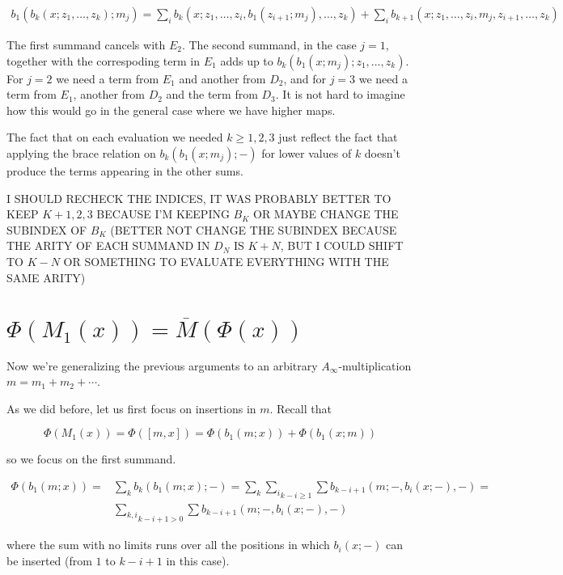 \documentclass[twoside]{article}
\begin{document}
\begin{align*}
b_1(b_k(x;z_1,\dots, z_k);m_j)=\sum_ib_k(x;z_1,\dots, z_i, b_1(z_{i+1};m_j),\dots, z_k)+\sum_ib_{k+1}(x;z_1,\dots, z_i,m_j,z_{i+1},\dots, z_k)
\end{align*}

The first summand cancels with $E_2$. The second summand, in the case $j=1$, together with the correspoding term in $E_1$ adds up to $b_k(b_1(x;m_j);z_1,\dots, z_k)$. For $j=2$ we need a term from $E_1$ and another from $D_2$, and for $j=3$ we need a term from $E_1$, another from $D_2$ and the term from $D_3$. It is not hard to imagine how this would go in the general case where we have higher maps. 

\begin{remark}
The fact that on each evaluation we needed $k\geq 1,2,3$ just reflect the fact that applying the brace relation on $b_k(b_1(x;m_j);-)$ for lower values of $k$ doesn't produce the terms appearing in the other sums. 
\end{remark}

I SHOULD RECHECK THE INDICES, IT WAS PROBABLY BETTER TO KEEP $K+1,2,3$ BECAUSE I'M KEEPING $B_K$ OR MAYBE CHANGE THE SUBINDEX OF $B_K$ (BETTER NOT CHANGE THE SUBINDEX BECAUSE THE ARITY OF EACH SUMMAND IN $D_N$ IS $K+N$, BUT I COULD SHIFT TO $K-N$ OR SOMETHING TO EVALUATE EVERYTHING WITH THE SAME ARITY)

\section{$\Phi(M_1(x))=\overline{M}(\Phi(x))$}
Now we're generalizing the previous arguments to an arbitrary $A_\infty$-multiplication $m=m_1+m_2+\cdots$.

As we did before, let us first focus on insertions in $m$. Recall that 

$$\Phi(M_1(x))=\Phi([m,x])=\Phi(b_1(m;x))+\Phi(b_1(x;m))$$

so we focus on the first summand. 

\begin{align*}
\Phi(b_1(m;x))=&\sum_k b_k(b_1(m;x);-)=\sum_k \underset{k-i\geq 1}{\sum_i} \sum b_{k-i+1}(m;-, b_i(x;-),-)=\\
&\underset{k-i+1> 0}{\sum_{k,i}}\sum b_{k-i+1}(m;-, b_i(x;-),-)
\end{align*}

where the sum with no limits runs over all the positions in which $b_i(x;-)$ can be inserted (from $1$ to $k-i+1$ in this case).
\end{document}
